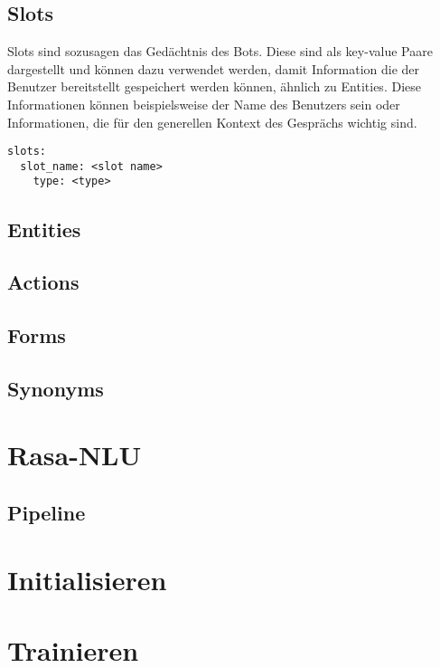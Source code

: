 \subsection{Slots}

Slots sind sozusagen das Gedächtnis des Bots.
Diese sind als key-value Paare dargestellt und können dazu verwendet werden, damit Information die der Benutzer bereitstellt gespeichert werden können, ähnlich zu Entities.
Diese Informationen können beispielsweise der Name des Benutzers sein oder Informationen, die für den generellen Kontext des Gesprächs wichtig sind.
\cite{slots}

\begin{lstlisting}[label={lst: Slot Example}]
slots:
  slot_name: <slot name>
    type: <type>
\end{lstlisting}


\subsection{Entities}


\subsection{Actions}


\subsection{Forms}


\subsection{Synonyms}


\section{Rasa-NLU}
\subsection{Pipeline}


\section{Initialisieren}


\section{Trainieren}
